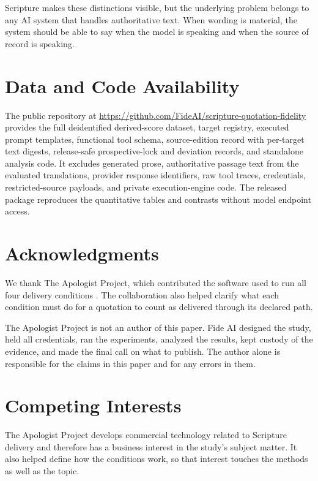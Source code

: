 \documentclass[11pt]{article}
\begin{document}
Scripture makes these distinctions visible, but the underlying problem belongs
to any AI system that handles authoritative text. When wording is material, the
system should be able to say when the model is speaking and when the source of
record is speaking.

\section*{Data and Code Availability}

The public repository at
\url{https://github.com/FideAI/scripture-quotation-fidelity} provides the full
deidentified derived-score dataset, target registry, executed prompt templates,
functional tool schema, source-edition record with per-target text digests,
release-safe prospective-lock and deviation records, and standalone analysis
code. It excludes generated prose, authoritative passage text from the
evaluated translations, provider response identifiers, raw tool traces,
credentials, restricted-source payloads, and private execution-engine code.
The released package reproduces the quantitative tables and contrasts without
model endpoint access.

\section*{Acknowledgments}

We thank The Apologist Project, which contributed the software used to run all
four delivery conditions \citep{apologist2026impl}. The collaboration also
helped clarify what each condition must do for a quotation to count as
delivered through its declared path.

The Apologist Project is not an author of this paper. Fide AI designed the
study, held all credentials, ran the experiments, analyzed the results,
kept custody of the evidence, and made the final call on what to publish.
The author alone is responsible for the claims in this paper and for any
errors in them.

\section*{Competing Interests}

The Apologist Project develops commercial technology related to Scripture
delivery and therefore has a business interest in the study's subject matter.
It also helped define how the conditions work, so that interest touches the
methods as well as the topic.
\end{document}
